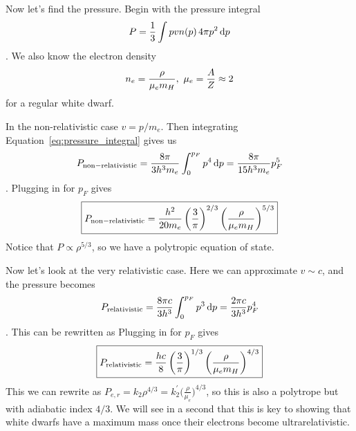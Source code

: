 \begin{enumerate}
      Now let's find the pressure.  Begin with the pressure integral
      \begin{dmath}\label{eq:pressure_integral}
      P = \frac{1}{3} \int p v n(p)\,4 \pi p^2\,\d p
      \end{dmath}.
      We also know the electron density
      \begin{dmath}
      n_e = \frac{\rho}{\mu_e m_H},~\mu_e \nolinebreak = \frac{A}{Z} \nolinebreak \approx 2
      \end{dmath}
      for a regular white dwarf.
      
      In the non-relativistic case $v = p/m_e$. Then integrating Equation~\ref{eq:pressure_integral}
      gives us
      \begin{dmath*}
      P_{\rm non-relativistic} = \frac{8\pi}{3h^3m_e}\int^{p_F}_0 p^4\,\d p \nolinebreak
                               = \frac{8\pi}{15h^3m_e}p_F^5
      \end{dmath*}.
      Plugging in for $p_F$ gives
      \begin{dmath}\boxed{
      P_{\rm non-relativistic} = \frac{h^2}{20m_e}\left(\frac{3}{\pi}\right)^{2/3}\left(\frac{\rho}{\mu_em_H}\right)^{5/3}
      }\end{dmath}
      Notice that $P\propto\rho^{5/3}$, so we have a polytropic equation of state.
      
      Now let's look at the very relativistic case. Here we can approximate $v \sim c$, and the pressure becomes
      \begin{dmath*}
      P_{\rm relativistic} = \frac{8\pi c}{3h^3}\int^{p_F}_0 p^3\,\d p \nolinebreak
                           = \frac{2\pi c}{3h^3}p_F^4
      \end{dmath*}.
      This can be rewritten as
      Plugging in for $p_F$ gives
      \begin{dmath}\boxed{
      P_{\rm relativistic} = \frac{hc}{8}\left(\frac{3}{\pi}\right)^{1/3}\left(\frac{\rho}{\mu_em_H}\right)^{4/3}
      }\end{dmath}
      This we can rewrite as $P_{e,r} = k_2 \rho^{4/3} = k_2^\prime \biggl(\frac{\rho}{\mu_e}\biggr)^{4/3}$, so this is also a polytrope but with adiabatic index $4/3$. We will see in a second that this is key to showing that white dwarfs have a maximum mass once their electrons become ultrarelativistic.
      

\end{enumerate}
